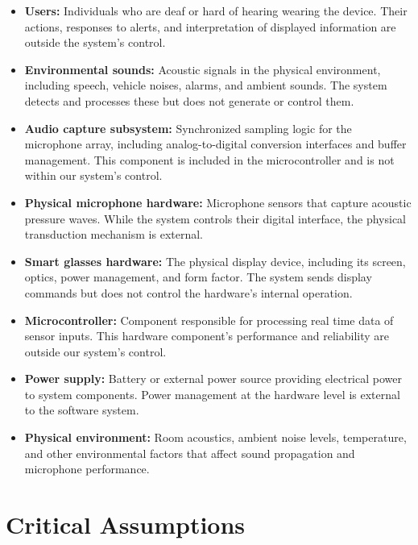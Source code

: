 \documentclass{article}
\begin{document}
\begin{itemize}
\item \textbf{Users:} Individuals who are deaf or hard of hearing wearing the
device. Their actions, responses to alerts, and interpretation of displayed
information are outside the system's control.

\item \textbf{Environmental sounds:} Acoustic signals in the physical
environment, including speech, vehicle noises, alarms, and ambient sounds. The
system detects and processes these but does not generate or control them.

\item \textbf{Audio capture subsystem:} Synchronized sampling logic for the
microphone array, including analog-to-digital conversion interfaces and buffer
management. This component is included in the microcontroller and is not within
our system's control.

\item \textbf{Physical microphone hardware:} Microphone sensors that capture
acoustic pressure waves. While the system controls their digital interface, the
physical transduction mechanism is external.

\item \textbf{Smart glasses hardware:} The physical display device, including
its screen, optics, power management, and form factor. The system sends display
commands but does not control the hardware's internal operation.

\item \textbf{Microcontroller:} \label{comp:microcontroller} Component
responsible for processing real time data of sensor inputs. This hardware
component's performance and reliability are outside our system's control.

\item \textbf{Power supply:} Battery or external power source providing
electrical power to system components. Power management at the hardware level is
external to the software system.

\item \textbf{Physical environment:} Room acoustics, ambient noise levels,
temperature, and other environmental factors that affect sound propagation and
microphone performance.
\end{itemize}



\section{Critical Assumptions}
\end{document}

